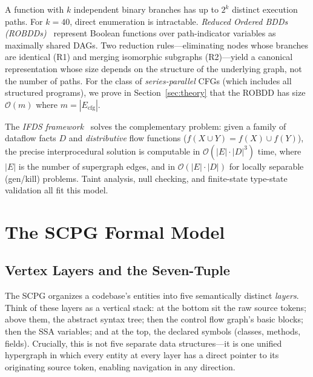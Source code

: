 \documentclass[journal,10pt,twoside]{IEEEtran}
\newcommand{\BigO}{\mathcal{O}}
\begin{document}
A function with $k$ independent binary branches has up to
$2^k$ distinct execution paths.  For $k = 40$, direct
enumeration is intractable.  \textit{Reduced Ordered BDDs
(ROBDDs)}~\cite{bryant86} represent Boolean functions over
path-indicator variables as maximally shared DAGs.  Two
reduction rules---eliminating nodes whose branches are
identical (R1) and merging isomorphic subgraphs (R2)---yield
a canonical representation whose size depends on the
structure of the underlying graph, not the number of paths.
For the class of \textit{series-parallel} CFGs (which
includes all structured programs), we prove in
Section~\ref{sec:theory} that the ROBDD has size $\BigO(m)$
where $m = |E_{\mathrm{cfg}}|$.

The \textit{IFDS framework}~\cite{reps95} solves the
complementary problem: given a family of dataflow facts $D$
and \textit{distributive} flow functions ($f(X \cup Y) =
f(X) \cup f(Y)$), the precise interprocedural solution is
computable in $\BigO(|E| \cdot |D|^3)$ time, where $|E|$ is
the number of supergraph edges, and in $\BigO(|E|\cdot|D|)$
for locally separable (gen/kill) problems.  Taint analysis,
null checking, and finite-state type-state validation all fit
this model.

\section{The SCPG Formal Model}\label{sec:model}

\subsection{Vertex Layers and the Seven-Tuple}

The SCPG organizes a codebase's entities into five
semantically distinct \textit{layers}.  Think of these layers
as a vertical stack: at the bottom sit the raw source tokens;
above them, the abstract syntax tree; then the control flow
graph's basic blocks; then the SSA variables; and at the top,
the declared symbols (classes, methods, fields).  Crucially,
this is not five separate data structures---it is one unified
hypergraph in which every entity at every layer has a direct
pointer to its originating source token, enabling navigation
in any direction.
\end{document}
